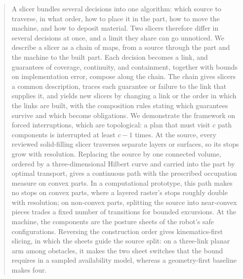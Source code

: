 \begin{abstract}
  A slicer bundles several decisions into one algorithm: which source to traverse, in what order, how to place it in the part, how to move the machine, and how to deposit material. Two slicers therefore differ in several decisions at once, and a limit they share can go unnoticed. We describe a slicer as a chain of maps, from a source through the part and the machine to the built part. Each decision becomes a link, and guarantees of coverage, continuity, and containment, together with bounds on implementation error, compose along the chain. The chain gives slicers a common description, traces each guarantee or failure to the link that supplies it, and yields new slicers by changing a link or the order in which the links are built, with the composition rules stating which guarantees survive and which become obligations. We demonstrate the framework on forced interruptions, which are topological: a plan that must visit $c$ path components is interrupted at least $c-1$ times. At the source, every reviewed solid-filling slicer traverses separate layers or surfaces, so its stops grow with resolution. Replacing the source by one connected volume, ordered by a three-dimensional Hilbert curve and carried into the part by optimal transport, gives a continuous path with the prescribed occupation measure on convex parts. In a computational prototype, this path makes no stops on convex parts, where a layered raster's stops roughly double with resolution; on non-convex parts, splitting the source into near-convex pieces trades a fixed number of transitions for bounded excursions. At the machine, the components are the posture sheets of the robot's safe configurations. Reversing the construction order gives kinematics-first slicing, in which the sheets guide the source split: on a three-link planar arm among obstacles, it makes the two sheet switches that the bound requires in a sampled availability model, whereas a geometry-first baseline makes four.
\end{abstract}
